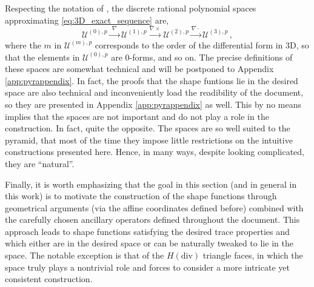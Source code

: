 Respecting the notation of \citet{Nigam_Phillips_11}, the discrete rational polynomial spaces approximating \eqref{eq:3D_exact_sequence} are,
\begin{equation}
	\mathcal{U}^{(0),p} \xrightarrow{\,\,\nabla\,\,} \mathcal{U}^{(1),p} \xrightarrow{\nabla\times} 
	\mathcal{U}^{(2),p} \xrightarrow{\nabla\cdot} \mathcal{U}^{(3),p} \,,
	\label{eq:pyramidsequence}
\end{equation}
where the $m$ in $\mathcal{U}^{(m),p}$ corresponds to the order of the differential form in 3D, so that the elements in $\mathcal{U}^{(0),p}$ are $0$-forms, and so on.
The precise definitions of these spaces are somewhat technical and will be postponed to Appendix \ref{app:pyrappendix}.
In fact, the proofs that the shape funtions lie in the desired space are also technical and inconveniently load the readibility of the document, so they are presented in Appendix \ref{app:pyrappendix} as well. 
This by no means implies that the spaces are not important and do not play a role in the construction.
In fact, quite the opposite.
The spaces are so well suited to the pyramid, that most of the time they impose little restrictions on the intuitive constructions presented here.
Hence, in many ways, despite looking complicated, they are ``natural''.

Finally, it is worth emphasizing that the goal in this section (and in general in this work) is to motivate the construction of the shape functions through geometrical arguments (via the affine coordinates defined before) combined with the carefully chosen ancillary operators defined throughout the document.
This approach leads to shape functions satisfying the desired trace properties and which either are in the desired space or can be naturally tweaked to lie in the space.
The notable exception is that of the $H(\mathrm{div})$ triangle faces, in which the space truly plays a nontrivial role and forces to consider a more intricate yet consistent construction.




